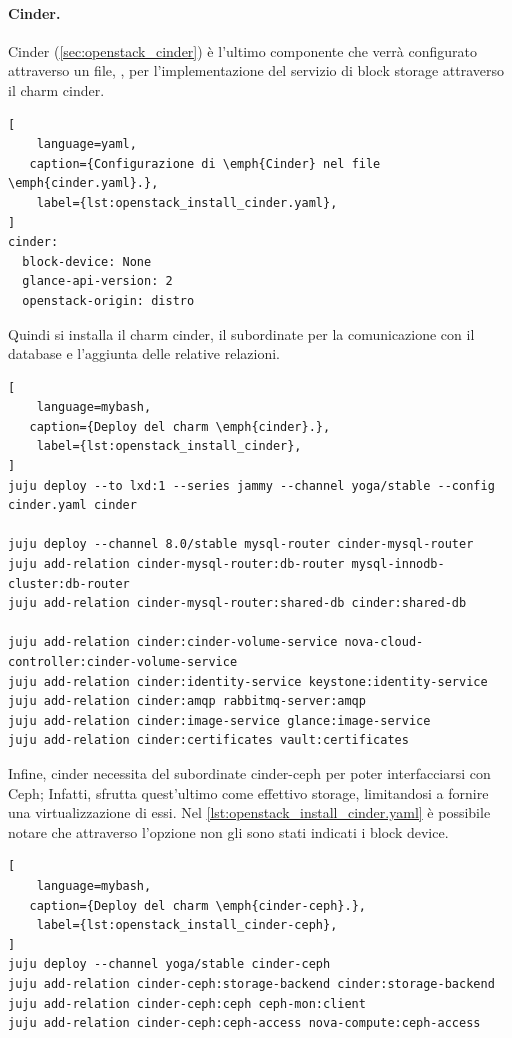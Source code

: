 \paragraph{Cinder.}
Cinder (\cref{sec:openstack_cinder}) è l'ultimo componente che verrà configurato attraverso un file, , per l'implementazione del servizio di block storage attraverso il charm cinder.
\begin{lstlisting}[
    language=yaml, 
   caption={Configurazione di \emph{Cinder} nel file \emph{cinder.yaml}.},
    label={lst:openstack_install_cinder.yaml},
]
cinder:
  block-device: None
  glance-api-version: 2
  openstack-origin: distro
\end{lstlisting}

\bigskip\noindent
Quindi si installa il charm cinder, il subordinate per la comunicazione con il database e l'aggiunta delle relative relazioni.
\begin{lstlisting}[
    language=mybash, 
   caption={Deploy del charm \emph{cinder}.},
    label={lst:openstack_install_cinder},
]
juju deploy --to lxd:1 --series jammy --channel yoga/stable --config cinder.yaml cinder

juju deploy --channel 8.0/stable mysql-router cinder-mysql-router
juju add-relation cinder-mysql-router:db-router mysql-innodb-cluster:db-router
juju add-relation cinder-mysql-router:shared-db cinder:shared-db

juju add-relation cinder:cinder-volume-service nova-cloud-controller:cinder-volume-service
juju add-relation cinder:identity-service keystone:identity-service
juju add-relation cinder:amqp rabbitmq-server:amqp
juju add-relation cinder:image-service glance:image-service
juju add-relation cinder:certificates vault:certificates
\end{lstlisting}

\bigskip\noindent
Infine, cinder necessita del subordinate cinder-ceph per poter interfacciarsi con Ceph;
% 
Infatti, sfrutta quest'ultimo come effettivo storage, limitandosi a fornire una virtualizzazione di essi.
% 
Nel \cref{lst:openstack_install_cinder.yaml} è possibile notare che attraverso l'opzione  non gli sono stati indicati i block device. 
\begin{lstlisting}[
    language=mybash, 
   caption={Deploy del charm \emph{cinder-ceph}.},
    label={lst:openstack_install_cinder-ceph},
]
juju deploy --channel yoga/stable cinder-ceph
juju add-relation cinder-ceph:storage-backend cinder:storage-backend
juju add-relation cinder-ceph:ceph ceph-mon:client
juju add-relation cinder-ceph:ceph-access nova-compute:ceph-access
\end{lstlisting}



